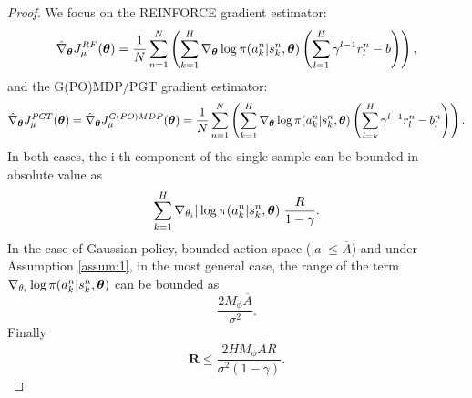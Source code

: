 \secondlemma*
\begin{proof}
We focus on the REINFORCE\cite{Williams1992} gradient estimator:
\[
\hat{\nabla}_{\boldsymbol{\theta}}J_{\mu}^{RF}(\boldsymbol{\theta}) = 
	\frac{1}{N}\sum\limits_{n=1}^N\left(
	\sum\limits_{k=1}^H\nabla_{\boldsymbol{\theta}}\log\pi(a_k^n|s_k^n,\boldsymbol{\theta})
	\left(\sum\limits_{l=1}^H\gamma^{l-1}r_l^n-b\right)\right),
\]
and the G(PO)MDP\cite{bb-ihgbps-01}/PGT\cite{Sutton1999a} gradient estimator:
\[
\hat{\nabla}_{\boldsymbol{\theta}}J_{\mu}^{PGT}(\boldsymbol{\theta}) = \hat{\nabla}_{\boldsymbol{\theta}}J_{\mu}^{G(PO)MDP}(\boldsymbol{\theta}) = 
	\frac{1}{N}\sum\limits_{n=1}^N\left(
	\sum\limits_{k=1}^H\nabla_{\boldsymbol{\theta}}\log\pi(a_k^n|s_k^n,\boldsymbol{\theta})
	\left(\sum\limits_{l=k}^H\gamma^{l-1}r_l^n-b_l^n\right)\right).
\]
In both cases, the i-th component of the single sample can be bounded in absolute value as
\[
\sum\limits_{k=1}^H\nabla_{\theta_i}|\log\pi(a_k^n|s_k^n,\boldsymbol{\theta})|\frac{R}{1-\gamma}.
\]
In the case of Gaussian policy, bounded action space ($|a| \leq \overline{A}$) and under Assumption \ref{assum:1}, in the most general case, the range of the term $\nabla_{\theta_i}\log\pi(a_k^n|s_k^n,\boldsymbol{\theta})$ can be bounded as
\[
\frac{2M_{\phi}\overline{A}}{\sigma^2}.
\] 
Finally
\[
\mathbf{R} \leq \frac{2HM_{\phi}\overline{A}R}{\sigma^2(1-\gamma)}.
\]
\end{proof}